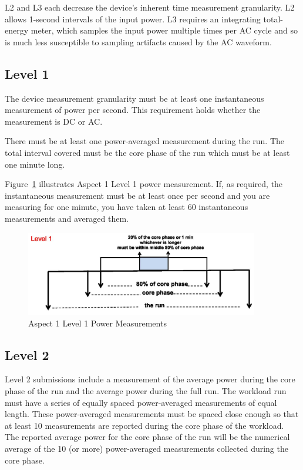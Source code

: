 \noindent
L2 and L3 each decrease the device's inherent time measurement granularity.  L2 allows 1-second intervals of the input power.  L3 requires an integrating total-energy meter, which samples the input power multiple times per AC cycle and so is much less susceptible to sampling artifacts caused by the AC waveform.  

\subsection{Level 1}
\noindent
The device measurement granularity must be at least one instantaneous measurement of power per second. This requirement holds whether the measurement is DC or AC.
\wl

\noindent
There must be at least one power-averaged measurement during the run.
The total interval covered must be the core phase of the run which must be at
least one minute long.
\wl

\noindent
Figure~\ref{fig:a1l1pm} illustrates Aspect 1 Level 1 power measurement. If, as required, the instantaneous measurement must be at least once per second and you are measuring for one minute, you have taken at least 60 instantaneous measurements and averaged them.

\begin{figure}
\centering
\includegraphics[width=4in]{fig3-3}
\caption{Aspect 1 Level 1 Power Measurements}
\label{fig:a1l1pm}
\end{figure}

\subsection{Level 2}
\noindent
Level 2 submissions include a measurement of the average power during the core phase of the run and the average power during the full run. The workload run must have a series of equally spaced power-averaged measurements of equal length. These power-averaged measurements must be spaced close enough so that at least 10 measurements are reported during the core phase of the workload. The reported average power for the core phase of the run will be the numerical average of the 10 (or more) power-averaged measurements collected during the core phase.  
\wl

